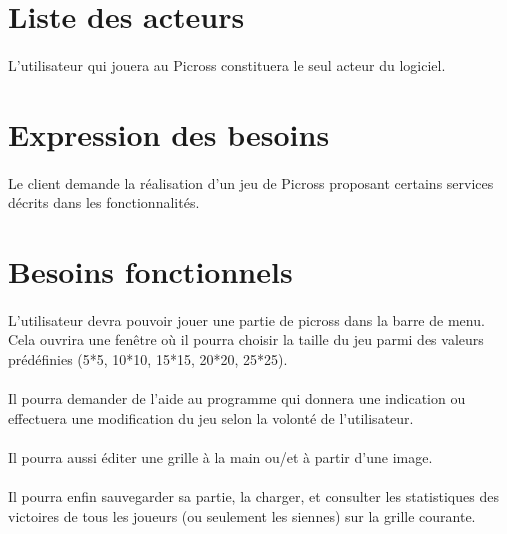 \section{Liste des acteurs}
	\paragraph*{}
	L'utilisateur qui jouera au Picross constituera le seul acteur du logiciel.


\section{Expression des besoins}
	\paragraph*{}
	Le client demande la réalisation d'un jeu de Picross proposant certains services décrits dans les fonctionnalités. 



\section{Besoins fonctionnels}
	\paragraph*{}
	L'utilisateur devra pouvoir jouer une partie de picross dans la barre de menu. Cela ouvrira une fenêtre où il pourra choisir la taille du jeu  parmi des valeurs prédéfinies (5*5, 10*10, 15*15, 20*20, 25*25). 
	\paragraph*{}
	Il pourra demander de l'aide au programme qui donnera une indication ou effectuera une modification du jeu selon la volonté de l'utilisateur.
	\paragraph*{}
	Il pourra aussi éditer une grille à la main ou/et à partir d'une image.
	\paragraph*{}
	Il pourra enfin sauvegarder sa partie, la charger, et consulter les statistiques des victoires de tous les joueurs (ou seulement les siennes) sur la grille courante.


